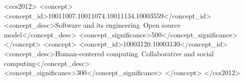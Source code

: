 \begin{CCSXML}
<ccs2012>
<concept>
<concept_id>10011007.10011074.10011134.10003559</concept_id>
<concept_desc>Software and its engineering~Open source model</concept_desc>
<concept_significance>500</concept_significance>
</concept>
<concept>
<concept_id>10003120.10003130</concept_id>
<concept_desc>Human-centered computing~Collaborative and social computing</concept_desc>
<concept_significance>300</concept_significance>
</concept>
</ccs2012>
\end{CCSXML}



\maketitle
